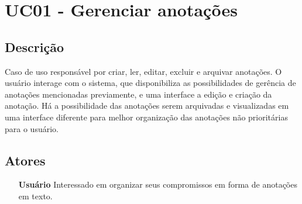 \documentclass[
	12pt,				%
	oneside,			%
	a4paper,			%
	english,			%
	brazil,				%
	]{abntex2}
\begin{document}




\chapter{UC01 - Gerenciar anotações}
\section{Descrição} 
Caso de uso responsável por criar, ler, editar, excluir e arquivar anotações. O usuário interage com o sistema, que disponibiliza as possibilidades de gerência de anotações mencionadas previamente, e uma interface a edição e criação da anotação. Há a possibilidade das anotações serem arquivadas e visualizadas em uma interface diferente para melhor organização das anotações não prioritárias para o usuário.

\section{Atores}
\begin{itemize}
    \item[\textbf{Usuário}] Interessado em organizar seus compromissos em forma de anotações em texto.
\end{itemize}
\end{document}
